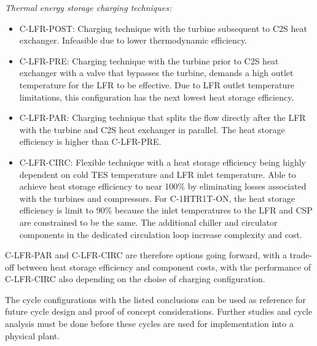 \begin{paracol}{2}
\textit{Thermal energy storage charging techniques:}
\begin{itemize}
    \item    C-LFR-POST: Charging technique with the turbine subsequent to C2S heat exchanger. Infeasible due to lower thermodynamic efficiency. 
    \item	C-LFR-PRE: Charging technique with the turbine prior to C2S heat exchanger with a valve that bypasses the turbine, demands a high outlet temperature for the LFR to be effective. Due to LFR outlet temperature limitations, this configuration has the next lowest heat storage efficiency.
    \item	C-LFR-PAR: Charging technique that splits the flow directly after the LFR with the turbine and C2S heat exchanger in parallel. The heat storage efficiency is higher than C-LFR-PRE.
    \item   C-LFR-CIRC: Flexible technique with a heat storage efficiency being highly dependent on cold TES temperature and LFR inlet temperature. Able to achieve heat storage efficiency to near 100\% by eliminating losses associated with the turbines and compressors. For C-1HTR1T-ON, the heat storage efficiency is limit to 90\% because the inlet temperatures to the LFR and CSP are constrained to be the same. The additional chiller and circulator components in the dedicated circulation loop increase complexity and cost. 
\end{itemize}

C-LFR-PAR and C-LFR-CIRC are therefore options going forward, with a trade-off between heat storage efficiency and component costs, with the performance of C-LFR-CIRC also depending on the choise of charging configuration.

The cycle configurations with the listed conclusions can be used as reference for future cycle design and proof of concept considerations. Further studies and cycle analysis must be done before these cycles are used for implementation into a physical plant. 

\end{paracol}





